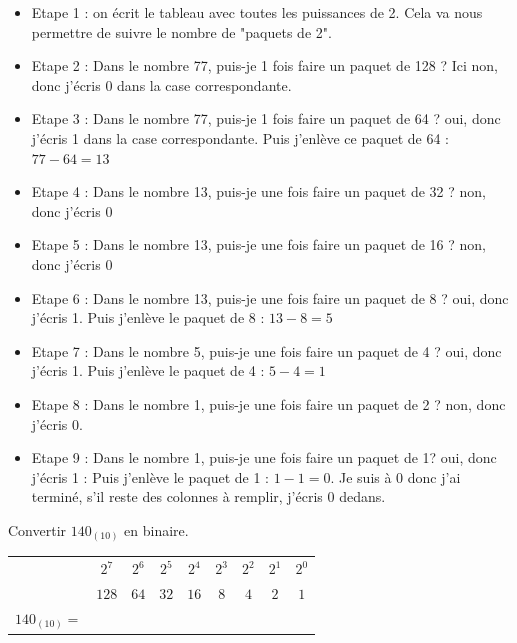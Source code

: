 \begin{itemize}
    \item Etape 1 : on écrit le tableau avec toutes les puissances de 2. Cela va nous permettre de suivre le nombre de "paquets de 2".
    \item Etape 2 : Dans le nombre 77, puis-je 1 fois faire un paquet de 128 ? Ici non, donc j'écris 0 dans la case correspondante.
    \item Etape 3 : Dans le nombre 77, puis-je 1 fois faire un paquet de 64 ? oui, donc j'écris 1 dans la case correspondante. Puis j'enlève ce paquet de 64 : $77-64 = 13$
    \item Etape 4 : Dans le nombre 13, puis-je une fois faire un paquet de 32 ? non, donc j'écris 0
    \item Etape 5 : Dans le nombre 13, puis-je une fois faire un paquet de 16 ? non, donc j'écris 0
    \item Etape 6 : Dans le nombre 13, puis-je une fois faire un paquet de 8 ? oui, donc j'écris 1. Puis j'enlève le paquet de 8 : $13-8 = 5$
    \item Etape 7 : Dans le nombre 5, puis-je une fois faire un paquet de 4 ? oui, donc j'écris 1. Puis j'enlève le paquet de 4 : $5-4 = 1$
    \item Etape 8 : Dans le nombre 1, puis-je une fois faire un paquet de 2 ? non, donc j'écris 0.
    \item Etape 9 : Dans le nombre 1, puis-je une fois faire un paquet de 1? oui, donc j'écris 1 :  Puis j'enlève le paquet de 1 : $1-1 = 0$. Je suis à 0 donc j'ai terminé, s'il reste des colonnes à remplir, j'écris 0 dedans.
\end{itemize}

\begin{Avous}
    Convertir $140_{(10)}$ en binaire. 
    \begin{center}
\begin{tabular}{lcccccccc}
    & $2^7$ & $2^6$ & $2^5$ & $2^4$ & $2^3$ & $2^2$ & $2^1$ & $2^0$\\
    & $128$ & $64$ & $32$ & $16$ & $8$ & $4$ & $2$ & $1$\\
    \hline
    $140_{(10)} = $ &  &  &  &  &  &  &  & \\
    \end{tabular}
\end{center}
\vspace{3cm}
\end{Avous}

